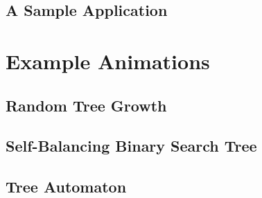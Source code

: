 \documentclass{article}
\begin{document}
\subsection{A Sample Application}

\section{Example Animations}
\subsection{Random Tree Growth}
\subsection{Self-Balancing Binary Search Tree}
\subsection{Tree Automaton}
\end{document}
